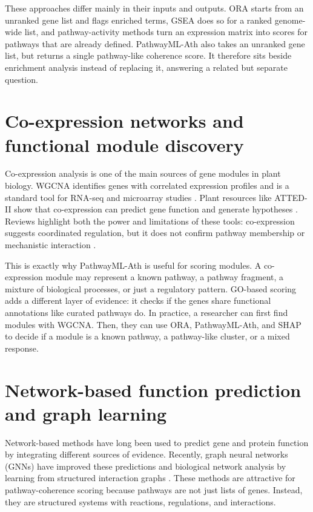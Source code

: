 \documentclass[12pt,letterpaper,oneside,openany]{book}
\begin{document}
These approaches differ mainly in their inputs and outputs. ORA starts from an unranked gene list and flags enriched terms, GSEA does so for a ranked genome-wide list, and pathway-activity methods turn an expression matrix into scores for pathways that are already defined. PathwayML-Ath also takes an unranked gene list, but returns a single pathway-like coherence score. It therefore sits beside enrichment analysis instead of replacing it, answering a related but separate question.

\section{Co-expression networks and functional module discovery}
\label{sec:lit_coexpression_extended}

Co-expression analysis is one of the main sources of gene modules in plant biology. WGCNA identifies genes with correlated expression profiles and is a standard tool for RNA-seq and microarray studies \citep{langfelder2008wgcna}. Plant resources like ATTED-II show that co-expression can predict gene function and generate hypotheses \citep{obayashi2018atted}. Reviews highlight both the power and limitations of these tools: co-expression suggests coordinated regulation, but it does not confirm pathway membership or mechanistic interaction \citep{usadel2009coexpression}.

This is exactly why PathwayML-Ath is useful for scoring modules. A co-expression module may represent a known pathway, a pathway fragment, a mixture of biological processes, or just a regulatory pattern. GO-based scoring adds a different layer of evidence: it checks if the genes share functional annotations like curated pathways do. In practice, a researcher can first find modules with WGCNA. Then, they can use ORA, PathwayML-Ath, and SHAP to decide if a module is a known pathway, a pathway-like cluster, or a mixed response.

\section{Network-based function prediction and graph learning}
\label{sec:lit_networks_extended}

Network-based methods have long been used to predict gene and protein function by integrating different sources of evidence. Recently, graph neural networks (GNNs) have improved these predictions and biological network analysis by learning from structured interaction graphs \citep{muzio2021biological}. These methods are attractive for pathway-coherence scoring because pathways are not just lists of genes. Instead, they are structured systems with reactions, regulations, and interactions.
\end{document}
